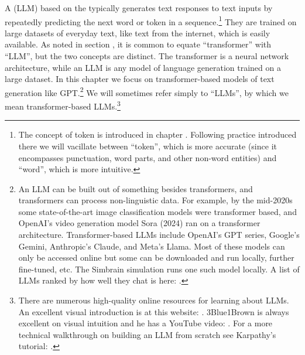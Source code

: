 
A  (LLM) based on the
 typically generates text responses to text inputs by
repeatedly predicting the next word or token in a sequence.\footnote{The
concept of token is introduced in chapter .
Following practice introduced there we will vacillate between ``token'', which
is more accurate (since it encompasses punctuation, word parts, and other
non-word entities) and ``word'', which is more intuitive.} They are trained on
large datasets of everyday text, like text from the internet, which is easily
available. As noted in section , it is common to
equate ``transformer'' with ``LLM'', but the two concepts are distinct. The
transformer is a neural network architecture, while an LLM is any model
of language generation trained on a large dataset.
In this chapter we focus on transformer-based models of text
generation like GPT.\footnote{An LLM can be built
out of something besides transformers, and transformers can process non-linguistic data. For example, by the mid-2020s some state-of-the-art image classification
models were transformer based, and OpenAI's video
generation model Sora (2024) ran on a transformer architecture. Transformer-based LLMs include
OpenAI's GPT series, Google's Gemini, Anthropic's Claude, and Meta's Llama.
Most of these models can only be accessed online but some can be
downloaded and run locally, further fine-tuned, etc. The Simbrain simulation
 runs one such model locally. A list of LLMs ranked by
how well they chat is here: .} We will
sometimes refer simply to ``LLMs'', by which we mean transformer-based
LLMs.\footnote{There are numerous high-quality online resources for learning
about LLMs. An excellent visual introduction is at this website:
. 3Blue1Brown is always
excellent on visual intuition and he has a YouTube video:
. For a more technical
walkthrough on building an LLM from scratch see Karpathy's tutorial:
.}

